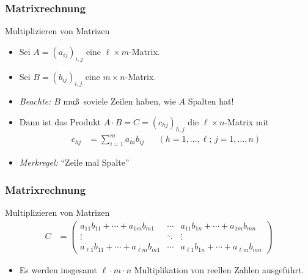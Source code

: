 \documentclass{beamer}
\renewcommand{\emph}[1]{{\textcolor{solarizedRed}{\itshape #1}}}
\newcommand{\ue}{\"u}
\newcommand{\mytitle}{Matrixrechnung}
\begin{document}
\begin{frame}\frametitle{\mytitle}
	\begin{block}{Multiplizieren von Matrizen}
		\begin{itemize}
		\item Sei $A=(a_{ij})_{i,j}$ eine $\ell\times m$-Matrix.
		\item Sei $B=(b_{ij})_{i,j}$ eine $m\times n$-Matrix.
		\item \emph{Beachte:} $B$ mu\ss\ soviele Zeilen haben, wie $A$ Spalten hat!
		\item Dann ist das Produkt $A\cdot B=C=(c_{hj})_{h,j}$ die $\ell\times n$-Matrix mit 
			\begin{align*}
				c_{hj}&=\sum_{i=1}^ma_{hi}b_{ij}&&(h=1,\ldots,\ell;\, j=1,\ldots,n)
			\end{align*}
		\item \emph{Merkregel:} ``Zeile mal Spalte''
		\end{itemize}
	\end{block}
\end{frame}

\begin{frame}\frametitle{\mytitle}
	\begin{block}{Multiplizieren von Matrizen}
		\begin{align*}
			C&=\begin{pmatrix}
				a_{11}b_{11}+\cdots+a_{1m}b_{m1}&\cdots&a_{11}b_{1n}+\cdots+a_{1m}b_{mn}\\
				\vdots&\ddots&\vdots\\
				a_{\ell1}b_{11}+\cdots+a_{\ell m}b_{m1}&\cdots&a_{\ell1}b_{1 n}+\cdots+a_{\ell m}b_{m n}
			\end{pmatrix}
			\end{align*}
			\begin{itemize}
				\item Es werden insgesamt $\ell\cdot m\cdot n$ Multiplikation von reellen Zahlen ausgef\ue hrt.
			\end{itemize}
		\end{block}
\end{frame}
\end{document}
